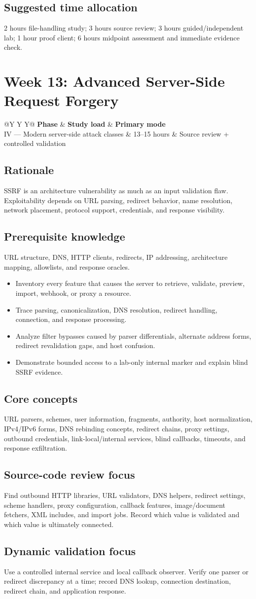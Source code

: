 \documentclass[11pt]{article}
\makeatletter
\newcommand{\weekheader}[4]{%
  \clearpage
  \section{Week #1: #2}
  \begin{tcolorbox}[colback=Navy,colframe=Navy,coltext=white]
    \begin{tabularx}{\linewidth}{@{}Y Y Y@{}}
      \textbf{Phase} & \textbf{Study load} & \textbf{Primary mode}\\
      #3 & #4 hours & Source review + controlled validation
    \end{tabularx}
  \end{tcolorbox}
}
\newcommand{\weekfield}[2]{%
  \Needspace{5\baselineskip}
  \subsection*{#1}
  #2
}
\makeatother
\begin{document}
\weekfield{Suggested time allocation}{2 hours file-handling study; 3 hours source
review; 3 hours guided/independent lab; 1 hour proof client; 6 hours midpoint
assessment and immediate evidence check.}

\weekheader{13}{Advanced Server-Side Request Forgery}{IV --- Modern server-side attack classes}{13--15}

\weekfield{Rationale}{SSRF is an architecture vulnerability as much as an input
validation flaw. Exploitability depends on URL parsing, redirect behavior, name
resolution, network placement, protocol support, credentials, and response
visibility.}

\weekfield{Prerequisite knowledge}{URL structure, DNS, HTTP clients, redirects,
IP addressing, architecture mapping, allowlists, and response oracles.}

\begin{objectivebox}
\begin{itemize}
  \item Inventory every feature that causes the server to retrieve, validate, preview, import, webhook, or proxy a resource.
  \item Trace parsing, canonicalization, DNS resolution, redirect handling, connection, and response processing.
  \item Analyze filter bypasses caused by parser differentials, alternate address forms, redirect revalidation gaps, and host confusion.
  \item Demonstrate bounded access to a lab-only internal marker and explain blind SSRF evidence.
\end{itemize}
\end{objectivebox}

\weekfield{Core concepts}{URL parsers, schemes, user information, fragments,
authority, host normalization, IPv4/IPv6 forms, DNS rebinding concepts, redirect
chains, proxy settings, outbound credentials, link-local/internal services,
blind callbacks, timeouts, and response exfiltration.}

\weekfield{Source-code review focus}{Find outbound HTTP libraries, URL validators,
DNS helpers, redirect settings, scheme handlers, proxy configuration, callback
features, image/document fetchers, XML includes, and import jobs. Record which
value is validated and which value is ultimately connected.}

\weekfield{Dynamic validation focus}{Use a controlled internal service and local
callback observer. Verify one parser or redirect discrepancy at a time; record
DNS lookup, connection destination, redirect chain, and application response.}
\end{document}
